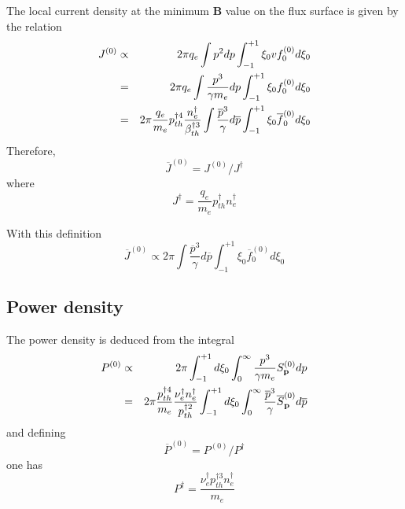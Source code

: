 The local current density at the minimum $\mathbf{B}$ value on the flux
surface is given by the relation 
\begin{eqnarray}
J^{\left( 0\right) } &\propto &2\pi q_{e}\int p^{2}dp\int_{-1}^{+1}\xi
_{0}vf_{0}^{\left( 0\right) }d\xi _{0}  \notag \\
&=&2\pi q_{e}\int \frac{p^{3}}{\gamma m_{e}}dp\int_{-1}^{+1}\xi
_{0}f_{0}^{\left( 0\right) }d\xi _{0}  \notag \\
&=&2\pi \frac{q_{e}}{m_{e}}p_{th}^{\dag 4}\frac{n_{e}^{\dag }}{\beta
_{th}^{\dag 3}}\int \frac{\overline{p}^{3}}{\gamma }d\overline{p}%
\int_{-1}^{+1}\xi _{0}\overline{f}_{0}^{\left( 0\right) }d\xi _{0}
\end{eqnarray}
Therefore, 
\begin{equation}
\overline{J}^{\left( 0\right) }=J^{\left( 0\right) }/J^{\dag }
\end{equation}
where 
\begin{equation}
J^{\dag }=\frac{q_{e}}{m_{e}}p_{th}^{\dag }n_{e}^{\dag }
\end{equation}

With this definition 
\begin{equation}
\overline{J}^{\left( 0\right) }\propto 2\pi \int \frac{\overline{p}^{3}}{
\gamma }d\overline{p}\int_{-1}^{+1}\xi _{0}\overline{f}_{0}^{\left( 0\right)
}d\xi _{0}
\end{equation}

\subsection{Power density}

The power density is deduced from the integral 
\begin{eqnarray}
P^{\left( 0\right) } &\propto &2\pi \int_{-1}^{+1}d\xi _{0}\int_{0}^{\infty }%
\frac{p^{3}}{\gamma m_{e}}S_{\mathbf{p}}^{\left( 0\right) }dp  \notag \\
&=&2\pi \frac{p_{th}^{\dag 4}}{m_{e}}\frac{\nu _{e}^{\dag }n_{e}^{\dag }}{%
p_{th}^{\dag 2}}\int_{-1}^{+1}d\xi _{0}\int_{0}^{\infty }\frac{\overline{p}
^{3}}{\gamma }\overline{S}_{\mathbf{p}}^{\left( 0\right) }d\overline{p}
\end{eqnarray}
and defining 
\begin{equation}
\overline{P}^{\left( 0\right) }=P^{\left( 0\right) }/P^{\dag }
\end{equation}
one has 
\begin{equation}
P^{\dag }=\frac{\nu _{e}^{\dag }p_{th}^{\dag 3}n_{e}^{\dag }}{m_{e}}
\end{equation}

